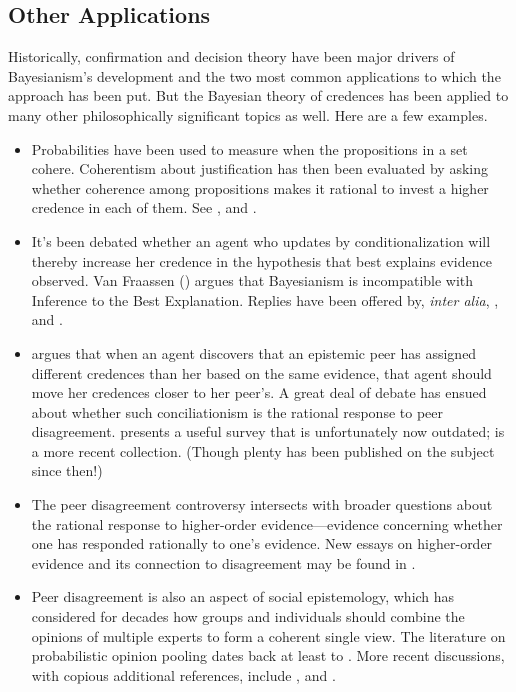 \subsection{Other Applications} \label{ss:furtherapps}
Historically, confirmation and decision theory have been major drivers of Bayesianism's development and the two most common applications to which the approach has been put. But the Bayesian theory of credences has been applied to many other philosophically significant topics as well. Here are a few examples.
\begin{itemize}
\item Probabilities have been used to measure when the propositions in a set cohere. Coherentism about justification has then been evaluated by asking whether coherence among propositions makes it rational to invest a higher credence in each of them. See \citet{ShogenjiCoherence,BovensHartmann,HuemerRefute}, and \citet{OlssonSEP}.
\item It's been debated whether an agent who updates by conditionalization will thereby increase her credence in the hypothesis that best explains evidence observed. Van Fraassen (\citeyear{vanFraassenLaws}) argues that Bayesianism is incompatible with Inference to the Best Explanation. Replies have been offered by, \emph{inter alia}, \citet{OkashaIBE,LiptonIBE,WeisbergIBE}, and \citet{HendersonIBE}.
\item \citet{ElgaReflection} argues that when an agent discovers that an epistemic peer has assigned different credences than her based on the same evidence, that agent should move her credences closer to her peer's. A great deal of debate has ensued about whether such conciliationism is the rational response to peer disagreement. \citet{ChristensenControversy} presents a useful survey that is unfortunately now outdated; \citet{ChristensenLackey} is a more recent collection. (Though plenty has been published on the subject since then!)
\item The peer disagreement controversy intersects with broader questions about the rational response to higher-order evidence---evidence concerning whether one has responded rationally to one's evidence. New essays on higher-order evidence and its connection to disagreement may be found in \citet{RasmussenSteglich}.
\item Peer disagreement is also an aspect of social epistemology, which has considered for decades how groups and individuals should combine the opinions of multiple experts to form a coherent single view. The literature on probabilistic opinion pooling dates back at least to \citet{BooleCombination}. More recent discussions, with copious additional references, include \citet{BradleyConsensus,RHB}, and \citet{Eaglhive}.
\end{itemize} 



